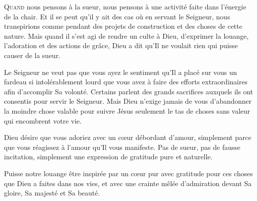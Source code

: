 \dvrule








\lettrine{Q}{uand} nous pensons à la sueur,
 nous pensons à une activité faite dans l'énergie de la chair.
 Et il se peut qu'il y ait des cas où en servant le Seigneur,
 nous transpirions \ocadr comme pendant des projets de construction
 et des choses de cette nature. Mais quand il s'est agi de rendre
 un culte à Dieu, d'exprimer la louange, l'adoration
 et des actions de grâce, Dieu a dit qu'Il ne voulait rien
 qui puisse causer de la sueur. 



Le Seigneur ne veut pas que vous ayez le sentiment qu'Il a placé sur vous
 un fardeau si intolérablement lourd que vous avez à faire des efforts
 extraordinaires afin d'accomplir Sa volonté. Certains parlent
 des grands sacrifices 
 auxquels ils ont consentis pour servir le Seigneur.
 Mais Dieu n'exige jamais de vous d'abandonner la moindre chose valable
 pour suivre Jésus \ocadr seulement le tas de choses sans valeur
 qui encombrent votre vie. 

Dieu désire que vous adoriez avec un c\oe{}ur débordant d'amour,
 simplement parce que vous réagissez à l'amour qu'Il vous manifeste.
 Pas de sueur, pas de fausse incitation,
 simplement une expression de gratitude pure et naturelle. 

Puisse notre louange être inspirée par un c\oe{}ur pur
 \ocadr avec gratitude pour ces choses que Dieu a faites dans nos vies, 
et avec une crainte mêlée d'admiration devant Sa gloire,
 Sa majesté et Sa beauté. 

